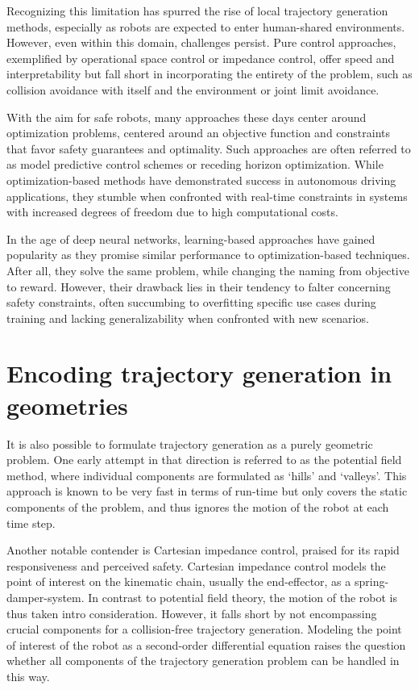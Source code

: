 Recognizing this limitation has spurred the rise of local
trajectory generation methods, especially as robots are
expected to enter human-shared environments. However, even
within this domain, challenges persist. Pure control
approaches, exemplified by operational space control or
impedance control, offer speed and interpretability but fall
short in incorporating the entirety of the problem, such as
collision avoidance with itself and the environment or
joint limit avoidance.

With the aim for safe robots, many approaches these days
center around optimization problems, centered around an objective
function and constraints that favor safety guarantees and
optimality. Such approaches are often referred to as model
predictive control schemes or receding horizon
optimization. While optimization-based methods have
demonstrated success in autonomous driving applications,
they stumble when confronted with real-time constraints in
systems with increased degrees of freedom due to high
computational costs.

In the age of deep neural networks, learning-based approaches have gained
popularity as they promise similar performance to
optimization-based techniques. After all, they solve the
same problem, while changing the naming from objective to
reward. However, their drawback lies in their tendency to falter concerning
safety constraints, often succumbing to overfitting specific use cases during
training and lacking generalizability when confronted with new scenarios.

\section{Encoding trajectory generation in geometries}

It is also possible to formulate trajectory generation as a
purely geometric problem. One early attempt in that
direction is referred to as the potential field method,
where individual components are formulated as `hills' and
`valleys'. This approach is known to be very fast in terms
of run-time but only covers the static components of the
problem, and thus ignores the motion of the robot at each
time step.

Another notable contender is Cartesian
impedance control, praised for its rapid responsiveness and
perceived safety.
Cartesian impedance control models the point of interest
on the kinematic chain, usually the end-effector, as a
spring-damper-system. In contrast to potential field theory,
the motion of the robot is thus taken intro consideration.
However, it falls short by not encompassing crucial
components for a collision-free trajectory generation.
Modeling the point of interest of the robot as a
second-order differential equation raises the question
whether all components of the trajectory generation problem
can be handled in this way. 

